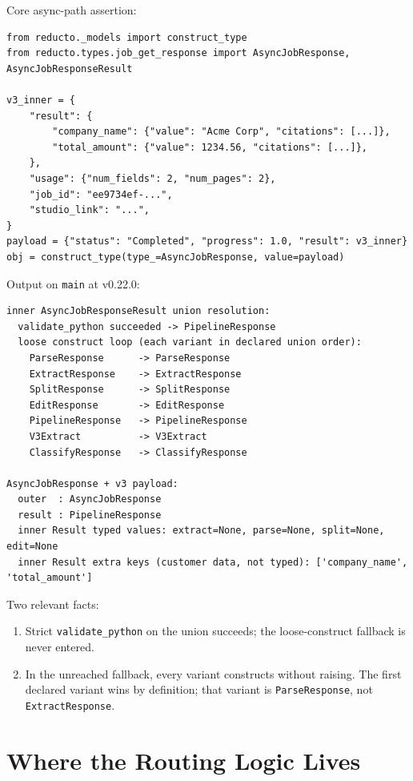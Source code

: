 \documentclass[11pt]{article}
\begin{document}
Core async-path assertion:

\begin{lstlisting}[style=py]
from reducto._models import construct_type
from reducto.types.job_get_response import AsyncJobResponse, AsyncJobResponseResult

v3_inner = {
    "result": {
        "company_name": {"value": "Acme Corp", "citations": [...]},
        "total_amount": {"value": 1234.56, "citations": [...]},
    },
    "usage": {"num_fields": 2, "num_pages": 2},
    "job_id": "ee9734ef-...",
    "studio_link": "...",
}
payload = {"status": "Completed", "progress": 1.0, "result": v3_inner}
obj = construct_type(type_=AsyncJobResponse, value=payload)
\end{lstlisting}

Output on \texttt{main} at v0.22.0:

\begin{lstlisting}[style=shell]
inner AsyncJobResponseResult union resolution:
  validate_python succeeded -> PipelineResponse
  loose construct loop (each variant in declared union order):
    ParseResponse      -> ParseResponse
    ExtractResponse    -> ExtractResponse
    SplitResponse      -> SplitResponse
    EditResponse       -> EditResponse
    PipelineResponse   -> PipelineResponse
    V3Extract          -> V3Extract
    ClassifyResponse   -> ClassifyResponse

AsyncJobResponse + v3 payload:
  outer  : AsyncJobResponse
  result : PipelineResponse
  inner Result typed values: extract=None, parse=None, split=None, edit=None
  inner Result extra keys (customer data, not typed): ['company_name', 'total_amount']
\end{lstlisting}

Two relevant facts:
\begin{enumerate}
  \item Strict \texttt{validate\_python} on the union succeeds; the loose-construct fallback is never entered.
  \item In the unreached fallback, every variant constructs without raising. The first declared variant wins by definition; that variant is \texttt{ParseResponse}, not \texttt{ExtractResponse}.
\end{enumerate}

\section{Where the Routing Logic Lives}
\end{document}
